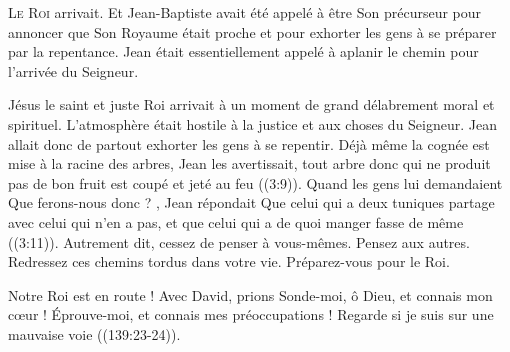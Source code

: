 


\lettrine{L}{e Roi} arrivait. Et Jean-Baptiste avait été appelé
 à être Son précurseur \ocadr pour annoncer que Son Royaume
 était proche et pour exhorter les gens à se préparer par la repentance.
 Jean était essentiellement appelé à aplanir le chemin
 pour l'arrivée du Seigneur.


Jésus \ocadr le saint et juste Roi \fcadr{} arrivait à un moment
 de grand délabrement moral et spirituel.
 L'atmosphère était hostile à la justice et aux choses du Seigneur.
 Jean allait donc de partout exhorter les gens à se repentir.
 \Og Déjà même la cognée est mise à la racine des arbres, Jean les avertissait,
 tout arbre donc qui ne produit pas de bon fruit est coupé et jeté au feu \Fg{}
 ((3:9)). 
 Quand les gens lui demandaient\frcolon{} 
 \Og Que ferons-nous donc ? \Fg{}, Jean répondait\frcolon{} 
 \Og Que celui qui a deux tuniques partage avec celui qui n'en a pas,
 et que celui qui a de quoi manger fasse de même \Fg{} ((3:11)).
 Autrement dit, cessez de penser à vous-mêmes. Pensez aux autres.
 Redressez ces chemins tordus dans votre vie. Préparez-vous pour le Roi.

Notre Roi est en route ! Avec David, prions\frcolon{} 
 \Og Sonde-moi, ô Dieu, et connais mon c\oe{}ur !
 Éprouve-moi, et connais mes préoccupations !
 Regarde si je suis sur une mauvaise voie \Fg{} ((139:23-24)).

\dvrule





